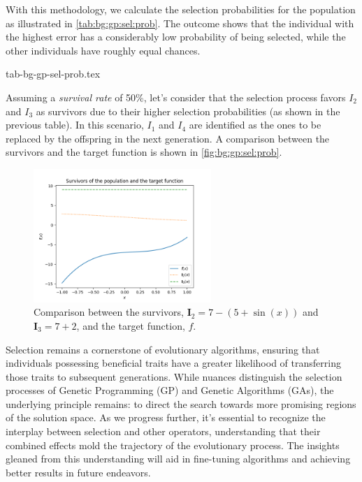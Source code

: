   With this methodology, we calculate the selection probabilities for the 
  population as illustrated in \vref{tab:bg:gp:sel:prob}.
  The outcome shows that 
  the individual with the highest error has a considerably low probability of 
  being selected, while the other individuals have roughly equal chances.

  {tab-bg-gp-sel-prob.tex}

  Assuming a \emph{survival rate} of 50\%, let's consider that the selection
  process favors \(I_2\) and \(I_3\) as survivors due to their higher selection
  probabilities (as shown in the previous table).
  In this scenario, \(I_1\) and \(I_4\) are identified as the ones to be replaced
  by the offspring in the next generation.
  A comparison between the survivors and the target function is shown in
  \vref{fig:bg:gp:sel:prob}.

  \begin{figure}[ht!]
    \centering
    \includegraphics[width=0.6\textwidth]{img/theoretical_framework/gp_pop_sel_survivors.png}
    \caption{
      Comparison between the survivors, \(\mathbf{I}_2 = 7 - (5 + \sin(x))\) and \(\mathbf{I}_3 = 7 + 2\), and the 
      target function, \(f\). 
    }
    \label{fig:bg:gp:sel:prob}
  \end{figure}

  Selection remains a cornerstone of evolutionary algorithms, ensuring that 
  individuals possessing beneficial traits have a greater likelihood of 
  transferring those traits to subsequent generations. While nuances 
  distinguish the selection processes of Genetic Programming (GP) and Genetic 
  Algorithms (GAs), the underlying principle remains: to direct the search 
  towards more promising regions of the solution space. As we progress further, 
  it's essential to recognize the interplay between selection and other 
  operators, understanding that their combined effects mold the trajectory of 
  the evolutionary process. The insights gleaned from this understanding will 
  aid in fine-tuning algorithms and achieving better results in future 
  endeavors.
